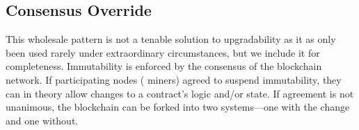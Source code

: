 




\subsection{Consensus Override}
\label{sec:hardfork}

This wholesale pattern is not a tenable solution to upgradability as it as only been used rarely under extraordinary circumstances, but we include it for completeness. Immutability is enforced by the consensus of the blockchain network. If participating nodes (
\eg miners) agreed to suspend immutability, they can in theory allow changes to a contract's logic and/or state. If agreement is not unanimous, the blockchain can be forked into two systems---one with the change and one without. 

